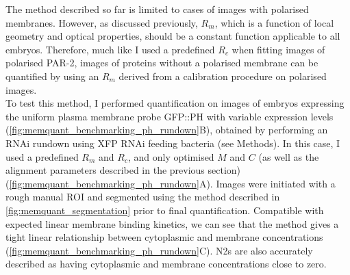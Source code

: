 \documentclass[12pt]{"article"}
\begin{document}
The method described so far is limited to cases of images with polarised membranes. However, as discussed previously, $R_m$, which is a function of local geometry and optical properties, should be a constant function applicable to all embryos. Therefore, much like I used a predefined $R_c$ when fitting images of polarised PAR-2, images of proteins without a polarised membrane can be quantified by using an $R_m$ derived from a calibration procedure on polarised images. \\

To test this method, I performed quantification on images of embryos expressing the uniform plasma membrane probe GFP::PH with variable expression levels (\cref{fig:memquant_benchmarking_ph_rundown}B), obtained by performing an RNAi rundown using XFP RNAi feeding bacteria (see Methods). In this case, I used a predefined $R_m$ and $R_c$, and only optimised $M$ and $C$ (as well as the alignment parameters described in the previous section) (\cref{fig:memquant_benchmarking_ph_rundown}A). Images were initiated with a rough manual ROI and segmented using the method described in \cref{fig:memquant_segmentation} prior to final quantification. Compatible with expected linear membrane binding kinetics, we can see that the method gives a tight linear relationship between cytoplasmic and membrane concentrations (\cref{fig:memquant_benchmarking_ph_rundown}C). N2s are also accurately described as having cytoplasmic and membrane concentrations close to zero.\\
\end{document}
